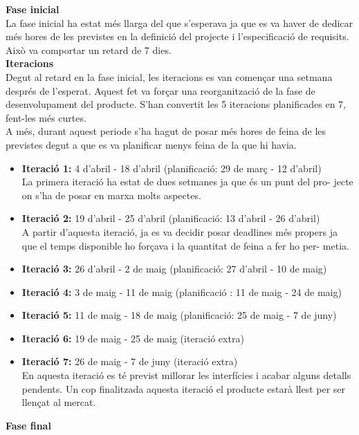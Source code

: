 \textbf{Fase inicial}\\

La fase inicial ha estat més llarga del que s’esperava ja que es va haver de dedicar més hores de les previstes en la definició del projecte i l’especificació de
requisits. Això va comportar un retard de 7 dies.\\

\textbf{Iteracions}\\

Degut al retard en la fase inicial, les iteracions es van començar una setmana després de l’esperat. Aquest fet va forçar una reorganització de la fase de
desenvolupament del producte. S’han convertit les 5 iteracions planificades en
7, fent-les més curtes.\\
A més, durant aquest periode s’ha hagut de posar més hores de feina de les
previstes degut a que es va planificar menys feina de la que hi havia.
\begin{itemize}
\item{}\textbf{Iteració 1:} 4 d’abril - 18 d’abril (planificació: 29 de març - 12 d’abril)\\
La primera iteració ha estat de dues setmanes ja que és un punt del pro-
jecte on s’ha de posar en marxa molts aspectes.
\item{}\textbf{Iteració 2:} 19 d’abril - 25 d’abril (planificació: 13 d’abril - 26 d’abril)\\
A partir d’aquesta iteració, ja es va decidir posar deadlines més propers
ja que el temps disponible ho forçava i la quantitat de feina a fer ho per-
metia.
\item{}\textbf{Iteració 3:} 26 d’abril - 2 de maig (planificació: 27 d’abril - 10 de maig)
\item{}\textbf{Iteració 4:} 3 de maig - 11 de maig (planificació : 11 de maig - 24 de maig)
\item{}\textbf{Iteració 5:} 11 de maig - 18 de maig (planificació: 25 de maig - 7 de juny)
\item{}\textbf{Iteració 6:} 19 de maig - 25 de maig (iteració extra)
\item{}\textbf{Iteració 7:} 26 de maig - 7 de juny (iteració extra)\\
En aquesta iteració es té previst millorar les interfícies i acabar alguns detalls pendents. Un cop finalitzada aquesta iteració el producte estarà llest
per ser llençat al mercat.
\end{itemize}

\textbf{Fase final}\\

